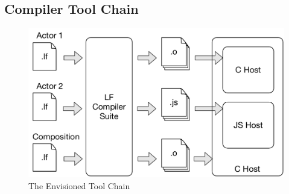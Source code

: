 \documentclass[sigconf]{acmart}
\newcommand{\martin}[1]{\mynote{Martin}{#1}{blue}}%
\newcommand{\marten}[1]{\mynote{Marten}{#1}{cyan}}%
\newcommand{\marjan}[1]{\mynote{Marjan}{#1}{magenta}}%
\begin{document}

\subsection{Compiler Tool Chain}

\begin{figure}[ht]
 \centering
 \includegraphics[width=0.8\linewidth]{img/lf-compiler}
 \caption{The Envisioned Tool Chain}
 \label{fig:lf-compiler}
\end{figure}
\end{document}
